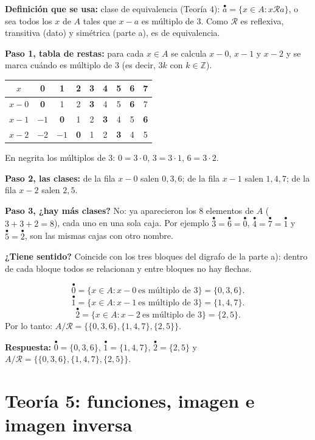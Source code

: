 \documentclass[11pt]{article}
\newcommand{\cl}[1]{\overset{\bullet}{#1}}
\newcommand{\R}{\mathcal R}
\begin{document}
\begin{explica}
\textbf{Definición que se usa:} clase de equivalencia (Teoría 4): $\cl a=\{x\in A: x\R a\}$, o sea todos los $x$ de $A$ tales que $x-a$ es múltiplo de $3$. Como $\R$ es reflexiva, transitiva (dato) y simétrica (parte a), es de equivalencia.

\textbf{Paso 1, tabla de restas:} para cada $x\in A$ se calcula $x-0$, $x-1$ y $x-2$ y se marca cuándo es múltiplo de $3$ (es decir, $3k$ con $k\in\mathbb Z$).
\begin{center}
\renewcommand{\arraystretch}{1.2}
\begin{tabular}{|c|cccccccc|}\hline
$x$ & 0&1&2&3&4&5&6&7\\\hline
$x-0$ & \textbf{0}&1&2&\textbf{3}&4&5&\textbf{6}&7\\
$x-1$ & $-1$&\textbf{0}&1&2&\textbf{3}&4&5&\textbf{6}\\
$x-2$ & $-2$&$-1$&\textbf{0}&1&2&\textbf{3}&4&5\\\hline
\end{tabular}
\end{center}
En negrita los múltiplos de $3$: $0=3\cdot0$, $3=3\cdot1$, $6=3\cdot2$.

\textbf{Paso 2, las clases:} de la fila $x-0$ salen $0,3,6$; de la fila $x-1$ salen $1,4,7$; de la fila $x-2$ salen $2,5$.

\textbf{Paso 3, ¿hay más clases?} No: ya aparecieron los $8$ elementos de $A$ ($3+3+2=8$), cada uno en una sola caja. Por ejemplo $\cl3=\cl6=\cl0$, $\cl4=\cl7=\cl1$ y $\cl5=\cl2$, son las mismas cajas con otro nombre.

\textbf{¿Tiene sentido?} Coincide con los tres bloques del digrafo de la parte a): dentro de cada bloque todos se relacionan y entre bloques no hay flechas.
\end{explica}

\[\cl0=\{x\in A: x-0\ \text{es múltiplo de }3\}=\{0,3,6\}.\]
\[\cl1=\{x\in A: x-1\ \text{es múltiplo de }3\}=\{1,4,7\}.\]
\[\cl2=\{x\in A: x-2\ \text{es múltiplo de }3\}=\{2,5\}.\]
Por lo tanto: $A/\R=\big\{\{0,3,6\},\{1,4,7\},\{2,5\}\big\}$.

\textbf{Respuesta:} $\cl0=\{0,3,6\}$, $\cl1=\{1,4,7\}$, $\cl2=\{2,5\}$ y $A/\R=\big\{\{0,3,6\},\{1,4,7\},\{2,5\}\big\}$.

\clearpage
\section*{Teoría 5: funciones, imagen e imagen inversa}
\end{document}
